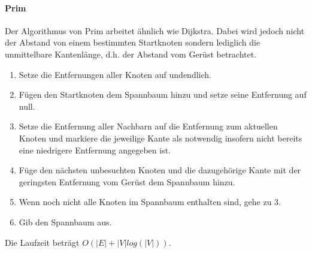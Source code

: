 \documentclass{article}
\begin{document}
\paragraph{Prim}
Der Algorithmus von Prim arbeitet ähnlich wie Dijkstra. Dabei wird jedoch nicht der Abstand von einem bestimmten Startknoten sondern lediglich die unmittelbare Kantenlänge, d.h. der Abstand vom Gerüst betrachtet.
\begin{enumerate}
    \item Setze die Entfernungen aller Knoten auf undendlich.
    \item Fügen den Startknoten dem Spannbaum hinzu und setze seine Entfernung auf null.
    \item Setze die Entfernung aller Nachbarn auf die Entfernung zum aktuellen Knoten und markiere die jeweilige Kante als notwendig insofern nicht bereits eine niedrigere Entfernung angegeben ist.
    \item Füge den nächsten unbesuchten Knoten und die dazugehörige Kante mit der geringsten Entfernung vom Gerüst dem Spannbaum hinzu. 
    \item Wenn noch nicht alle Knoten im Spannbaum enthalten sind, gehe zu 3.
    \item Gib den Spannbaum aus.
\end{enumerate}
Die Laufzeit beträgt $O(|E|+|V|log(|V|))$.
\end{document}
